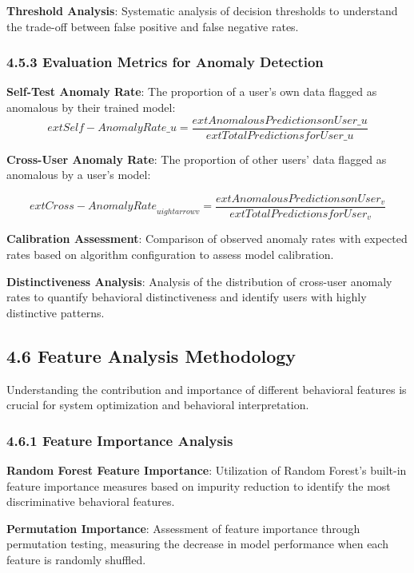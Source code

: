 \documentclass[
  11pt,
  a4paper,
]{article}
\begin{document}
\textbf{Threshold Analysis}: Systematic analysis of decision thresholds
to understand the trade-off between false positive and false negative
rates.

\subsubsection{4.5.3 Evaluation Metrics for Anomaly
Detection}\label{evaluation-metrics-for-anomaly-detection}

\textbf{Self-Test Anomaly Rate}: The proportion of a user's own data
flagged as anomalous by their trained model:
\[ ext{Self-Anomaly Rate}\_u = \frac{ ext{Anomalous Predictions on User}\_u}{ ext{Total Predictions for User}\_u}\]

\textbf{Cross-User Anomaly Rate}: The proportion of other users' data
flagged as anomalous by a user's model:

\[
    ext{Cross-Anomaly Rate}_{u
ightarrow v} = \frac{   ext{Anomalous Predictions on User}_v}{  ext{Total Predictions for User}_v}
\]

\textbf{Calibration Assessment}: Comparison of observed anomaly rates
with expected rates based on algorithm configuration to assess model
calibration.

\textbf{Distinctiveness Analysis}: Analysis of the distribution of
cross-user anomaly rates to quantify behavioral distinctiveness and
identify users with highly distinctive patterns.

\subsection{4.6 Feature Analysis
Methodology}\label{feature-analysis-methodology}

Understanding the contribution and importance of different behavioral
features is crucial for system optimization and behavioral
interpretation.

\subsubsection{4.6.1 Feature Importance
Analysis}\label{feature-importance-analysis}

\textbf{Random Forest Feature Importance}: Utilization of Random
Forest's built-in feature importance measures based on impurity
reduction to identify the most discriminative behavioral features.

\textbf{Permutation Importance}: Assessment of feature importance
through permutation testing, measuring the decrease in model performance
when each feature is randomly shuffled.
\end{document}
